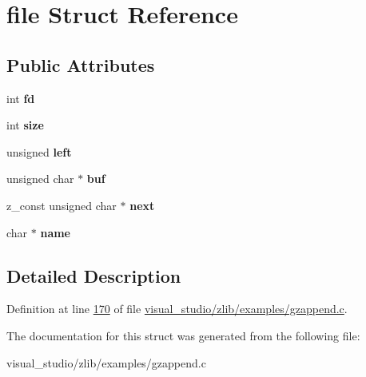 \hypertarget{structfile}{}\section{file Struct Reference}
\label{structfile}
\subsection*{Public Attributes}
\begin{DoxyCompactItemize}
\item 
\mbox{\label{structfile_abcdc3058fcb2b789cd4ce5f62f274363}} 
int {\bfseries fd}
\item 
\mbox{\label{structfile_a83a90719edeee627bd6fefe5f8af58ce}} 
int {\bfseries size}
\item 
\mbox{\label{structfile_a1daada626c3f3cb05e53c452005bf85c}} 
unsigned {\bfseries left}
\item 
\mbox{\label{structfile_a2a55a0319818df281235998d5d72c367}} 
unsigned char $\ast$ {\bfseries buf}
\item 
\mbox{\label{structfile_af9f694a5f724018f99cffa79c11374c3}} 
z\+\_\+const unsigned char $\ast$ {\bfseries next}
\item 
\mbox{\label{structfile_ac7c304f6be8a15b9e16c00edbc11dba0}} 
char $\ast$ {\bfseries name}
\end{DoxyCompactItemize}


\subsection{Detailed Description}


Definition at line \hyperlink{visual__studio_2zlib_2examples_2gzappend_8c_source_l00170}{170} of file \hyperlink{visual__studio_2zlib_2examples_2gzappend_8c_source}{visual\+\_\+studio/zlib/examples/gzappend.\+c}.



The documentation for this struct was generated from the following file\+:\begin{DoxyCompactItemize}
\item 
visual\+\_\+studio/zlib/examples/gzappend.\+c\end{DoxyCompactItemize}
